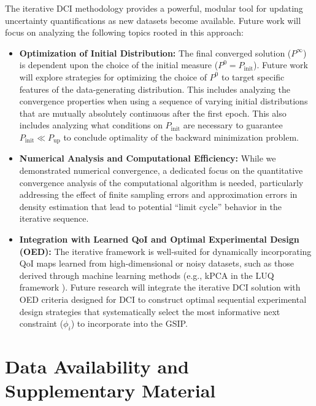 \documentclass{article}
\newcommand{\initmeas}{P_{\text{init}}}
\newcommand{\updatemeas}{P_{\text{up}}}
\begin{document}
The iterative DCI methodology provides a powerful, modular tool for updating uncertainty quantifications as new datasets become available. 
Future work will focus on analyzing the following topics rooted in this approach:

\begin{itemize}
    \item \textbf{Optimization of Initial Distribution:} The final converged solution ($P^\infty$) is dependent upon the choice of the initial measure ($P^0 = P_{\text{init}}$). 
    Future work will explore strategies for optimizing the choice of $P^0$ to target specific features of the data-generating distribution. 
    This includes analyzing the convergence properties when using a sequence of varying initial distributions that are mutually absolutely continuous after the first epoch.
    This also includes analyzing what conditions on $\initmeas$ are necessary to guarantee $\initmeas\ll\updatemeas$ to conclude optimality of the backward minimization problem. 
    \item \textbf{Numerical Analysis and Computational Efficiency:} While we demonstrated numerical convergence, a dedicated focus on the quantitative convergence analysis of the computational algorithm is needed, particularly addressing the effect of finite sampling errors and approximation errors in density estimation that lead to potential ``limit cycle'' behavior in the iterative sequence.
    \item \textbf{Integration with Learned QoI and Optimal Experimental Design (OED):} The iterative framework is well-suited for dynamically incorporating QoI maps learned from high-dimensional or noisy datasets, such as those derived through machine learning methods (e.g., kPCA in the LUQ framework \cite{MSB+22, RHB25}). 
    Future research will integrate the iterative DCI solution with OED criteria designed for DCI to construct optimal sequential experimental design strategies that systematically select the most informative next constraint ($\phi_i$) to incorporate into the GSIP. 
\end{itemize}

\section{Data Availability and Supplementary Material}\label{sec:supplementary}
\end{document}
